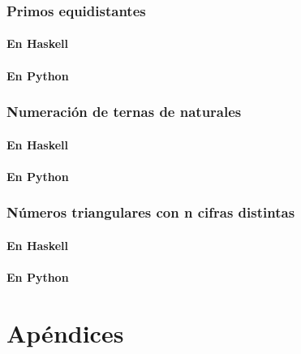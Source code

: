 \documentclass[a4paper,12pt,twoside]{book}
\begin{document}
\section{Primos equidistantes}
\subsection{En Haskell}
\subsection{En Python}

\section{Numeración de ternas de naturales}
\subsection{En Haskell}
\subsection{En Python}

\section{Números triangulares con n cifras distintas}
\subsection{En Haskell}
\subsection{En Python}

\part*{Apéndices}
\appendix

% 



\end{document}
